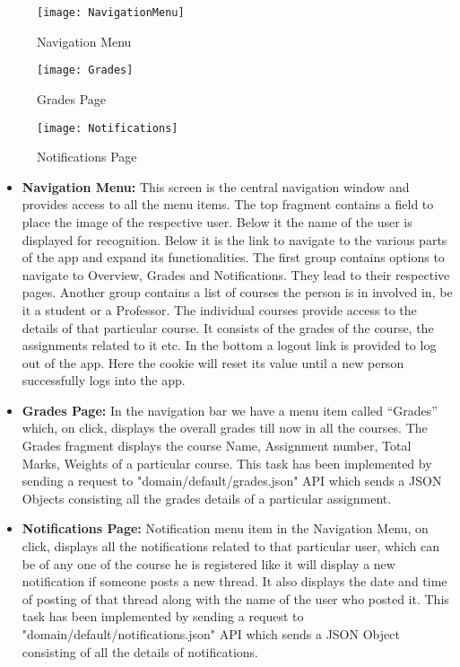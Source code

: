 \documentclass[12pt]{article}
\begin{document}
\begin{itemize}
    \begin{figure}[h]
    \centering
    \begin{minipage}[b]{0.32\linewidth}
    \texttt{[image: NavigationMenu]} 
    \caption*{Navigation Menu}
    \label{fig:minipage1}
    \end{minipage}
    \quad
    \begin{minipage}[b]{0.3\linewidth}
    \texttt{[image: Grades]} 
    \caption*{Grades Page}
    \label{fig:minipage2}
    \end{minipage}
    \quad
    \begin{minipage}[b]{0.3\linewidth}
    \texttt{[image: Notifications]} 
    \caption*{Notifications Page}
    \label{fig:minipage2}
    \end{minipage}
    \end{figure}
    \begin{itemize}
    \newpage \item \textbf{Navigation Menu:} This screen is the central navigation window and provides access to all the menu items. The top fragment contains a field to place the image of the respective user. Below it the name of the user is displayed for recognition. Below it is the link to navigate to the various parts of the app and expand its functionalities. The first group contains options to navigate to Overview, Grades and Notifications. They lead to their respective pages. Another group contains a list of courses the person is in involved in, be it a student or a Professor. The individual courses provide access to the details of that particular course. It consists of the grades of the course, the assignments related to it etc.
    In the bottom a logout link is provided to log out of the app. Here the cookie will reset its value until a new person successfully logs into the app.
    \item \textbf{Grades Page:} 
    In the navigation bar we have a menu item called “Grades” which, on click, displays the overall grades till now in all the courses. The Grades fragment displays the course Name, Assignment number, Total Marks, Weights of a particular course. This task has been implemented by sending a request to "domain/default/grades.json" API which sends a JSON Objects consisting all the grades details of a particular assignment.
    \item \textbf{Notifications Page:} 
    Notification menu item in the Navigation Menu, on click, displays all the notifications related to that particular user, which can be of any one of the course he is registered like it will display a new notification if someone posts a new thread. It also displays the date and time of posting of that thread along with the name of the user who posted it. This task has been implemented by sending a request to "domain/default/notifications.json" API which sends a JSON Object consisting of all the details of notifications.
    \end{itemize}
    

\end{itemize}
\end{document}
